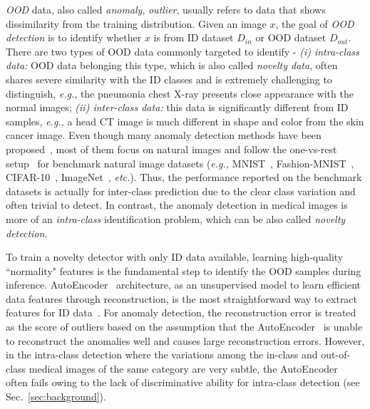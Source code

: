 \documentclass[12pt]{spieman}  %
\begin{document}
\begin{spacing}{2}
\textit{OOD} data, also called \textit{anomaly}, \textit{outlier}, usually refers to data that shows dissimilarity from the training distribution. Given an image $x$, the goal of \textit{OOD detection} is to identify whether $x$ is from ID dataset $D_{in}$ or OOD dataset $D_{out}$. 
There are two types of OOD data commonly targeted to identify - \textit{(i) intra-class data:} OOD data belonging this type, which is also called \textit{novelty data}, often shares severe similarity with the ID classes and is extremely challenging to distinguish, \textit{e.g.}, the pneumonia chest X-ray presents close appearance with the normal images; \textit{(ii) inter-class data:} this data is significantly different from ID samples, \textit{e.g.,} a head CT image is much different in shape and color from the skin cancer image. Even though many anomaly detection methods have been proposed~\cite{schlachter2019deep:schlachter,liznerski2020explainable:explainable}, most of them focus on natural images and follow the one-vs-rest setup~\cite{tack2020csi:tack} for benchmark natural image datasets (\textit{e.g.,} MNIST~\cite{lecun-mnisthandwrittendigit-2010}, Fashion-MNIST~\cite{xiao2017fashion}, CIFAR-10~\cite{krizhevsky2010cifar}, ImageNet~\cite{deng2009imagenet}, \textit{etc.}). Thus, the performance reported on the benchmark datasets is actually for inter-class prediction due to the clear class variation and often trivial to detect. In contrast, the anomaly detection in medical images is more of an \emph{intra-class} identification problem, which can be also called \textit{novelty detection}.

To train a novelty detector with only ID data available, learning high-quality ``normality" features is the fundamental step to identify the OOD samples during inference. AutoEncoder~\cite{mcclelland1986parallel} architecture, as an unsupervised model to learn efficient data features through reconstruction, is the most straightforward way to extract features for ID data~\cite{ruff2018deep:ruff}. For anomaly detection, the reconstruction error is treated as the score of outliers based on the assumption that the AutoEncoder~\cite{mcclelland1986parallel} is unable to reconstruct the anomalies well and causes large reconstruction errors. However, in the intra-class detection where the variations among the in-class and out-of-class medical images of the same category are very subtle, the AutoEncoder~\cite{mcclelland1986parallel} often fails owing to the lack of discriminative ability for intra-class detection (see Sec.~\ref{sec:background}).


\end{spacing}
\end{document}
